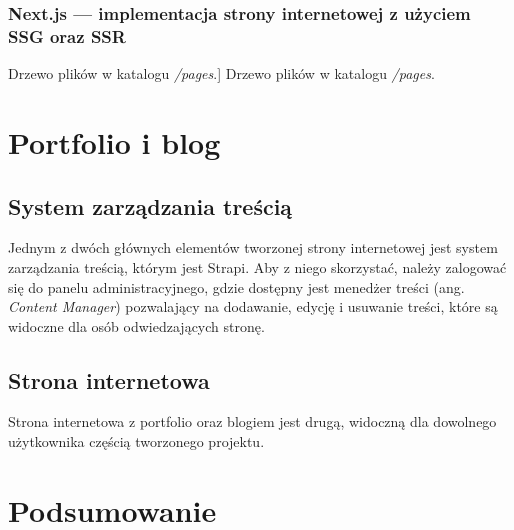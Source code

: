 \documentclass[12pt]{article}
\numberwithin{figure}{section}
\begin{document}
\begin{sloppypar}
\subsubsection{Next.js --- implementacja strony internetowej z użyciem SSG oraz SSR}

\begin{code}[htbp]
    
    \caption
    [Drzewo plików w katalogu \textit{/pages}.]
    {Drzewo plików w katalogu \textit{/pages}.}
    \label{chapter4:tree}
\end{code}


\newpage

\section{Portfolio i blog}


\subsection{System zarządzania treścią}

Jednym z dwóch głównych elementów tworzonej strony internetowej jest system zarządzania treścią, którym jest Strapi. Aby z niego skorzystać, należy zalogować się do panelu administracyjnego, gdzie dostępny jest menedżer treści (ang. \textit{Content Manager}) pozwalający na dodawanie, edycję i usuwanie treści, które są widoczne dla osób odwiedzających stronę. 


\subsection{Strona internetowa}

Strona internetowa z portfolio oraz blogiem jest drugą, widoczną dla dowolnego użytkownika częścią tworzonego projektu. 


\newpage 

\section{Podsumowanie}


\newpage 

%
    \listoffigures
    \clearpage


\end{sloppypar}
\end{document}
